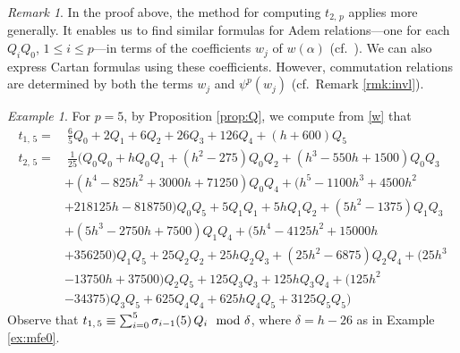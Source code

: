 \documentclass{gtpart}
\theoremstyle{definition}
\theoremstyle{remark}
\newtheorem{rmk}[thm]{Remark}
\newtheorem{ex}[thm]{Example}
\newcommand{\md}{~~{\rm mod}~}
\newcommand{\A}{\alpha}
\renewcommand{\d}{\delta}
\newcommand{\si}{\sigma}
\renewcommand{\=}{\approx}
\renewcommand{\-}{\sim}
\numberwithin{equation}{section}
\numberwithin{thm}{section}
\begin{document}
\begin{rmk}
 \label{rmk:Adem}
 In the proof above, the method for computing $t_{2,\,p}$ applies more generally.  
 It enables us to find similar formulas for Adem relations---one 
 for each $Q_i Q_0$, $1 \leq i \leq p$---in terms of the coefficients $w_j$ of $w(\A)$ 
 (cf.~\cite[proof of Proposition 3.6\,(iv)]{p3}).  
 We can also express Cartan formulas using these coefficients.  
 However, commutation relations are determined by both the terms $w_j$ and $\psi^p(w_j)$ 
 (cf.~Remark \ref{rmk:invl}).  
\end{rmk}
\begin{ex}
 \label{ex:t5}
 For $p = 5$, by Proposition \ref{prop:Q}, 
 we compute from \eqref{w} that 
 \begin{equation*}
  \begin{split}
   t_{1,\,5} = & ~ \frac{6}{5} Q_0 + 2 Q_1 + 6 Q_2 + 26 Q_3 + 126 Q_4 + (h + 600) Q_5 \\
   t_{2,\,5} = & ~ \frac{1}{25} \big( Q_0 Q_0 + h Q_0 Q_1 + (h^2 - 275) Q_0 Q_2 + (h^3 - 550 h + 1500) Q_0 Q_3 \\
               & + (h^4 - 825 h^2 + 3000 h + 71250) Q_0 Q_4 + (h^5 - 1100 h^3 + 4500 h^2 \\
               & + 218125 h - 818750) Q_0 Q_5 + 5 Q_1 Q_1 + 5 h Q_1 Q_2 + (5 h^2 - 1375) Q_1 Q_3 \\
               & + (5 h^3 - 2750 h + 7500) Q_1 Q_4 + (5 h^4 - 4125 h^2 + 15000 h \\
               & + 356250) Q_1 Q_5 + 25 Q_2 Q_2 + 25 h Q_2 Q_3 + (25 h^2 - 6875) Q_2 Q_4 + (25 h^3 \\
               & - 13750 h + 37500) Q_2 Q_5 + 125 Q_3 Q_3 + 125 h Q_3 Q_4 + (125 h^2 \\
               & - 34375) Q_3 Q_5 + 625 Q_4 Q_4 + 625 h Q_4 Q_5 + 3125 Q_5 Q_5 \big) 
  \end{split}
 \end{equation*}
 Observe that $t_{1,\,5} \equiv \sum_{i = 0}^5 \si_{i - 1}(5) \, Q_i \md \d$, where $\d = h - 26$ as in Example \ref{ex:mfe0}.  
\end{ex}
\end{document}
